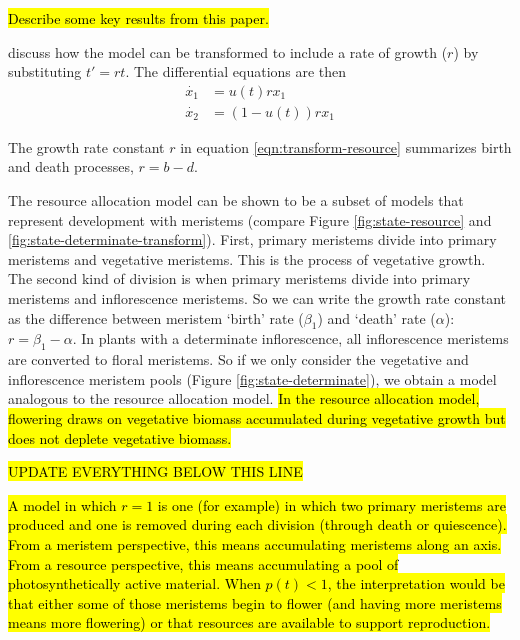 \documentclass[12pt, oneside]{article}   	%
\begin{document}
\hl{Describe some key results from this paper.}

\cite{King1982a} discuss how the model can be transformed to include a rate of growth ($r$) by substituting $t' = rt$. The differential equations are then
%
\begin{align}
\dot{x_1} & = u(t) r x_1 \nonumber \\
\dot{x_2} & = (1-u(t)) r x_1 
\label{eqn:transform-resource}
\end{align}

The growth rate constant $r$ in equation \ref{eqn:transform-resource} summarizes birth and death processes, $r = b - d$.

The resource allocation model can be shown to be a subset of models that represent development with meristems (compare Figure \ref{fig:state-resource} and \ref{fig:state-determinate-transform}). First, primary meristems divide into primary meristems and vegetative meristems. This is the process of vegetative growth. The second kind of division is when primary meristems divide into primary meristems and inflorescence meristems. So we can write the growth rate constant as the difference between meristem `birth' rate ($\beta_1$) and `death' rate ($\alpha$): $r = \beta_1 - \alpha$. In plants with a determinate inflorescence, all inflorescence meristems are converted to floral meristems. So if we only consider the vegetative and inflorescence meristem pools (Figure \ref{fig:state-determinate}), we obtain a model analogous to the resource allocation model. \hl{In the resource allocation model, flowering draws on vegetative biomass accumulated during vegetative growth but does not deplete vegetative biomass.}

\hl{UPDATE EVERYTHING BELOW THIS LINE}

\hl{A model in which $ r = 1 $ is one (for example) in which two primary meristems are produced and one is removed during each division (through death or quiescence). From a meristem perspective, this means accumulating meristems along an axis. From a resource perspective, this means accumulating a pool of photosynthetically active material. When $p(t)<1$, the interpretation would be that either some of those meristems begin to flower (and having more meristems means more flowering) or that resources are available to support reproduction.}
\end{document}

